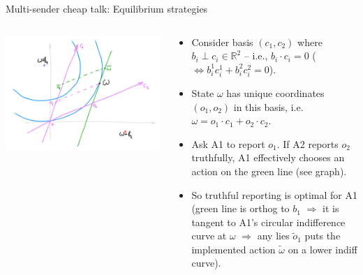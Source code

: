 \documentclass[english,10pt
,aspectratio=169
]{beamer}
\begin{document}
\begin{frame}{Multi-sender cheap talk: Equilibrium strategies}
	\begin{columns}
		\begin{column}{0.5\textwidth}
			\begin{center}
				\includegraphics[scale=0.65]{pics/M4/battaglini04.png}
			\end{center}
		\end{column}
		\begin{column}{0.5\textwidth}
			{\small
				\begin{itemize}
					\item Consider basis $(c_1,c_2)$ where $b_i \perp c_i \in \mathbb{R}^2$ -- i.e., $b_i \cdot c_i = 0$ ($\iff b_i^1 c_i^1 + b_i^2 c_i^2 = 0$). 
					\item State $\omega$ has unique coordinates $(o_1,o_2)$ in this basis, i.e. $\omega = o_1 \cdot c_1 + o_2 \cdot c_2$.
					\item Ask A1 to report $o_1$. If A2 reports $o_2$ truthfully, A1 effectively chooses an action on the green line (see graph). 
					\item So truthful reporting is optimal for A1 (green line is orthog to $b_1$ $\Rightarrow$ it is tangent to A1's circular indifference curve at $\omega$ $\Rightarrow$ any lies $\tilde{o}_1$ puts the implemented action $\tilde{\omega}$ on a lower indiff curve).
				\end{itemize}
			}
		\end{column}
	\end{columns}
\end{frame}
\end{document}
